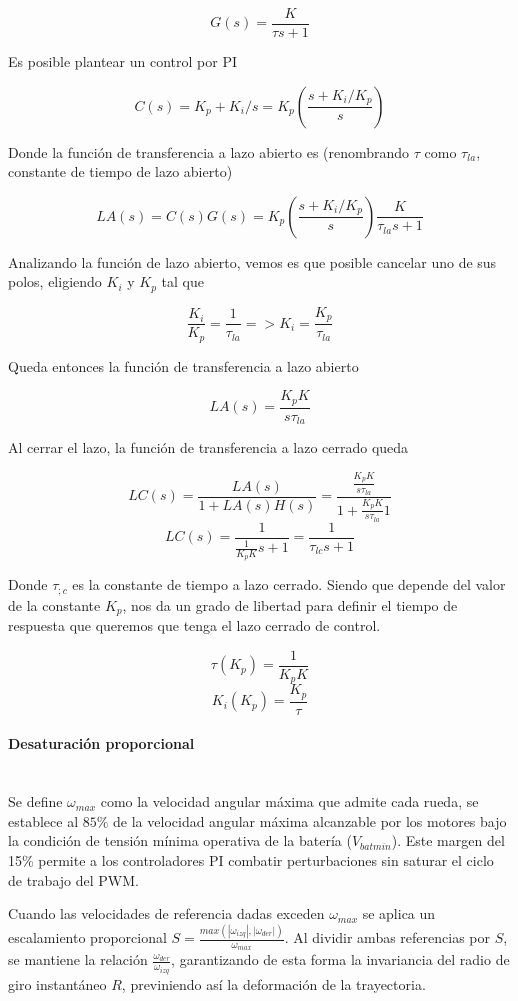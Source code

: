 \[G(s) = \frac{K}{\tau s + 1}\]

Es posible plantear un control por PI

\[C(s) = K_p + K_i/s = K_p(\frac{s+K_i/K_p}{s})\]

Donde la función de transferencia a lazo abierto es (renombrando $\tau$ como $\tau_{la}$, constante de tiempo de lazo abierto)

\[LA(s) = C(s)G(s) =  K_p(\frac{s+K_i/K_p}{s}) \frac{K}{\tau_{la} s + 1}\]

Analizando la función de lazo abierto, vemos es que posible cancelar uno de sus polos, eligiendo $K_i$ y $K_p$ tal que

\[\frac{K_i}{K_p} = \frac{1}{\tau_{la}} => K_i=\frac{K_p}{\tau_{la}}\]

Queda entonces la función de transferencia a lazo abierto

\[LA(s) = \frac{K_pK}{s\tau_{la}}\]

Al cerrar el lazo, la función de transferencia a lazo cerrado queda

\[LC(s) = \frac{LA(s)}{1+LA(s)H(s)} = \frac{\frac{K_pK}{s\tau_{la}}}{1+\frac{K_pK}{s\tau_{la}}1}\] 
\[LC(s) = \frac{1}{\frac{1}{K_pK}s+1} = \frac{1}{\tau_{lc}s+1}\]

Donde $\tau_{;c}$ es la constante de tiempo a lazo cerrado. Siendo que depende del valor de la constante $K_p$, nos da un grado de libertad para definir el tiempo de respuesta que queremos que tenga el lazo cerrado de control.

\[\tau(K_p) = \frac{1}{K_pK}\]
\[K_i(K_p) = \frac{K_p}{\tau}\]

\paragraph{Desaturación proporcional}~\\
Se define $\omega_{max}$ como la velocidad angular máxima que admite cada rueda, se establece al $85\%$ de la velocidad angular máxima alcanzable por los motores bajo la condición de tensión mínima operativa de la batería ($V_{bat min}$). Este margen del 15\% permite a los controladores PI combatir perturbaciones sin saturar el ciclo de trabajo del PWM.

Cuando las velocidades de referencia dadas exceden $\omega_{max}$ se aplica un escalamiento proporcional $S=\frac{max(|\omega_{izq}|,|\omega_{der}|)}{\omega_{max}}$. Al dividir ambas referencias por $S$, se mantiene la relación $\frac{\omega_{der}}{\omega_{izq}}$, garantizando de esta forma la invariancia del radio de giro instantáneo $R$, previniendo así la deformación de la trayectoria.

